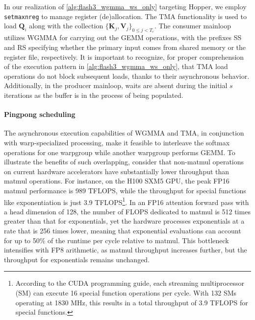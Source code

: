 In our realization of \cref{alg:flash3_wgmma_ws_only} targeting Hopper, we employ \verb|setmaxnreg| to manage register (de)allocation. The TMA functionality is used to load $\mathbf{Q}_i$ along with the collection $\{ \mathbf{K}_j, \mathbf{V}_j \}_{0 \leq j < T_c}$. The consumer mainloop utilizes WGMMA for carrying out the GEMM operations, with the prefixes SS and RS specifying whether the primary input comes from shared memory or the register file, respectively. It is important to recognize, for proper comprehension of the execution pattern in \cref{alg:flash3_wgmma_ws_only}, that TMA load operations do not block subsequent loads, thanks to their asynchronous behavior. Additionally, in the producer mainloop, waits are absent during the initial $s$ iterations as the buffer is in the process of being populated.

\paragraph{Pingpong scheduling} The asynchronous execution capabilities of WGMMA and TMA, in conjunction with warp-specialized processing, make it feasible to interleave the softmax operations for one warpgroup while another warpgroup performs GEMM. To illustrate the benefits of such overlapping, consider that non-matmul operations on current hardware accelerators have substantially lower throughput than matmul operations. For instance, on the H100 SXM5 GPU, the peak FP16 matmul performance is 989 TFLOPS, while the throughput for special functions like exponentiation is just 3.9 TFLOPS\footnote{According to the CUDA programming guide, each streaming multiprocessor (SM) can execute 16 special function operations per cycle. With 132 SMs operating at 1830 MHz, this results in a total throughput of 3.9 TFLOPS for special functions.}. In an FP16 attention forward pass with a head dimension of 128, the number of FLOPS dedicated to matmul is 512 times greater than that for exponentials, yet the hardware processes exponentials at a rate that is 256 times lower, meaning that exponential evaluations can account for up to 50\% of the runtime per cycle relative to matmul. This bottleneck intensifies with FP8 arithmetic, as matmul throughput increases further, but the throughput for exponentials remains unchanged.


